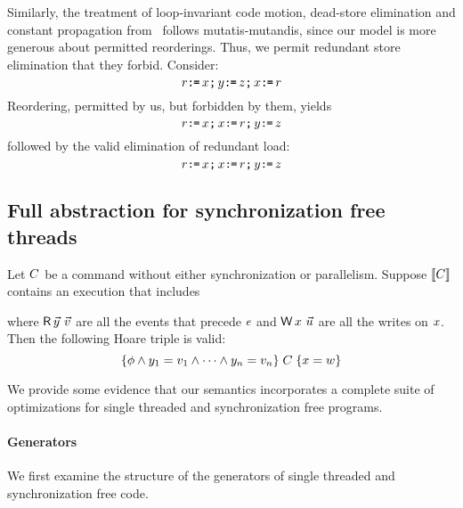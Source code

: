 Similarly, the treatment of loop-invariant code motion, dead-store elimination and constant propagation from~\citet{Dolan:2018:BDR:3192366.3192421} follows mutatis-mutandis, since our model is more generous about permitted reorderings.  Thus, we permit  redundant store elimination that they forbid.
Consider:
\[ r \texttt{:}\mkern-1mu\texttt{=}\, x \texttt{;}\, y \texttt{:}\mkern-1mu\texttt{=}\, z  \texttt{;}\, x \texttt{:}\mkern-1mu\texttt{=}\, r \]
Reordering, permitted by us, but forbidden by them, yields
\[ r \texttt{:}\mkern-1mu\texttt{=}\, x \texttt{;}\, x \texttt{:}\mkern-1mu\texttt{=}\, r \texttt{;}\, y \texttt{:}\mkern-1mu\texttt{=}\, z  \]
followed by the valid elimination of redundant load:
\[ r \texttt{:}\mkern-1mu\texttt{=}\, x \texttt{;}\, x \texttt{:}\mkern-1mu\texttt{=}\, r \texttt{;}\, y \texttt{:}\mkern-1mu\texttt{=}\, z  \]

\subsection{Full abstraction for synchronization free threads}

Let $C$ be a command without either synchronization or parallelism.
Suppose $\llbracket C\rrbracket$ contains an execution that includes
\begin{tikzdisplay}[node distance=1em]
\end{tikzdisplay}
where $\DR{\vec{\bLoc}}{\vec{\aVal}}$ are all the events that precede $e$ and
$\DW{\aLoc}{\vec{\dVal}}$ are all the writes on $x$.
Then the following Hoare triple is valid:
\begin{displaymath}
  \{\phi\land y_1=v_1\land\cdots\land y_n=v_n\}\;C\;\{x=w\}  
\end{displaymath}



We provide some evidence that our semantics incorporates a complete suite of optimizations for single threaded and synchronization free programs.

\paragraph*{Generators}
We first examine the structure of the generators of single threaded and synchronization free code.  

